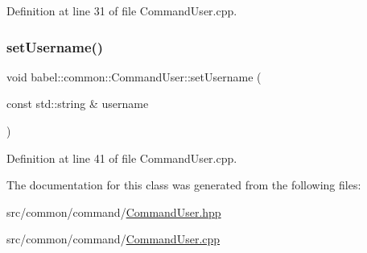 Definition at line 31 of file Command\+User.\+cpp.

\mbox{\label{classbabel_1_1common_1_1_command_user_afd950c8ec500ff9a40de2d0a8d9b9144}} 
\subsubsection{\texorpdfstring{set\+Username()}{setUsername()}}
{\footnotesize\ttfamily void babel\+::common\+::\+Command\+User\+::set\+Username (\begin{DoxyParamCaption}\item[{const std\+::string \&}]{username }\end{DoxyParamCaption})}



Definition at line 41 of file Command\+User.\+cpp.



The documentation for this class was generated from the following files\+:\begin{DoxyCompactItemize}
\item 
src/common/command/\mbox{\hyperlink{_command_user_8hpp}{Command\+User.\+hpp}}\item 
src/common/command/\mbox{\hyperlink{_command_user_8cpp}{Command\+User.\+cpp}}\end{DoxyCompactItemize}
